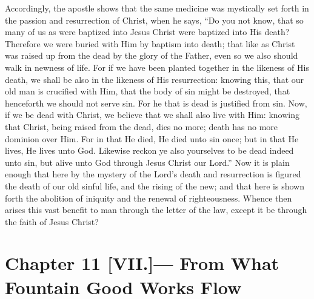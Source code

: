 \documentclass[10pt, twocolumn, oneside, a4paper]{memoir}
\newcommand{\gloss}[1]{%
    \marginpar[\RaggedLeft \footnotesize{#1}]{\RaggedRight \footnotesize{#1}}}
\begin{document}
Accordingly, the apostle shows that the same medicine was mystically set forth in the passion and resurrection of Christ, when he says, ``Do you not know, that so many of us as were baptized into Jesus Christ were baptized into His death? Therefore we were buried with Him by baptism into death; that like as Christ was raised up from the dead by the glory of the Father, even so we also should walk in newness of life. For if we have been planted together in the likeness of His death, we shall be also in the likeness of His resurrection: knowing this, that our old man is crucified with Him, that the body of sin might be destroyed, that henceforth we should not serve sin. For he that is dead is justified from sin. Now, if we be dead with Christ, we believe that we shall also live with Him: knowing that Christ, being raised from the dead, dies no more; death has no more dominion over Him. For in that He died, He died unto sin once; but in that He lives, He lives unto God. Likewise reckon ye also yourselves to be dead indeed unto sin, but alive unto God through Jesus Christ our Lord.'' \gloss{Romans 6:3-11} Now it is plain enough that here by the mystery of the Lord's death and resurrection is figured the death of our old sinful life, and the rising of the new; and that here is shown forth the abolition of iniquity and the renewal of righteousness. Whence then arises this vast benefit to man through the letter of the law, except it be through the faith of Jesus Christ?
\section*{Chapter 11 [VII.]— From What Fountain Good Works Flow}
\end{document}
